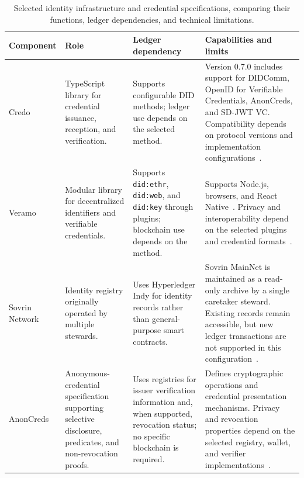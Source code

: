 \begin{table}[htbp]
\centering
\footnotesize
\caption{Selected identity infrastructure and credential specifications, comparing their functions, ledger dependencies, and technical limitations.}
\label{tab:ssi-platforms}
\setlength{\tabcolsep}{3pt}
\renewcommand{\arraystretch}{1.15}
\begin{tabular}{>{\raggedright\arraybackslash}m{}>{\raggedright\arraybackslash}m{}>{\raggedright\arraybackslash}m{}>{\raggedright\arraybackslash}m{}}
\toprule
\textbf{Component} & \textbf{Role} & \textbf{Ledger dependency} & \textbf{Capabilities and limits} \\
\midrule

Credo &
TypeScript library for credential issuance, reception, and verification. &
Supports configurable DID methods; ledger use depends on the selected method. &
Version 0.7.0 includes support for DIDComm, OpenID for Verifiable Credentials, AnonCreds, and SD-JWT VC. Compatibility depends on protocol versions and implementation configurations~\cite{platform-credo-code}. \\

\addlinespace[5pt]

Veramo &
Modular library for decentralized identifiers and verifiable credentials. &
Supports \texttt{did:ethr}, \texttt{did:web}, and \texttt{did:key} through plugins; blockchain use depends on the method. &
Supports Node.js, browsers, and React Native~\cite{platform-veramo-code}. Privacy and interoperability depend on the selected plugins and credential formats~\cite{platform-veramo-agent,platform-veramo-plugins}. \\

\addlinespace[5pt]

Sovrin Network &
Identity registry originally operated by multiple stewards. &
Uses Hyperledger Indy for identity records rather than general-purpose smart contracts. &
Sovrin MainNet is maintained as a read-only archive by a single caretaker steward. Existing records remain accessible, but new ledger transactions are not supported in this configuration~\cite{platform-sovrin-status,platform-indy-node}. \\

\addlinespace[5pt]

AnonCreds &
Anonymous-credential specification supporting selective disclosure, predicates, and non-revocation proofs. &
Uses registries for issuer verification information and, when supported, revocation status; no specific blockchain is required. &
Defines cryptographic operations and credential presentation mechanisms. Privacy and revocation properties depend on the selected registry, wallet, and verifier implementations~\cite{platform-anoncreds}. \\


\end{tabular}
\end{table}
